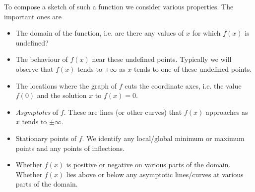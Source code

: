 \documentclass[extrafontsizes, twoside, a4paper]{memoir}
\theoremstyle{plain}%
\theoremstyle{definition}
\theoremstyle{remark}
\begin{document}
To compose a sketch of such a function we consider various properties. The important ones are
\begin{itemize}
\item
The domain of the function, i.e. are there any values of $x$ for which $f(x)$ is undefined?
\item
The behaviour of $f(x)$ near these undefined points. Typically we will observe that $f(x)$ tends to $\pm \infty$ as $x$ tends to one of these undefined points.
\item
The locations where the graph of $f$ cuts the coordinate axes, i.e. the value $f(0)$ and the solution $x$ to $f(x)=0$.
\item
\textit{Asymptotes} of $f$. These are lines (or other curves) that $f(x)$ approaches as $x$ tends to $\pm \infty$.
\item
Stationary points of $f$. We identify any local/global minimum or maximum points and any points of inflections.
\item
Whether $f(x)$ is positive or negative on various parts of the domain. Whether $f(x)$ lies above or below any asymptotic lines/curves at various parts of the domain.
\end{itemize}
\end{document}
